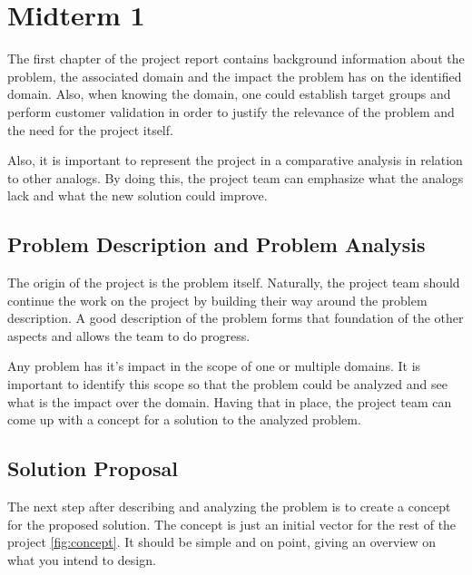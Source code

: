 \chapter{Midterm 1}

The first chapter of the project report contains background information about the problem, the associated domain and the impact the problem has on the identified domain. 
Also, when knowing the domain, one could establish target groups and perform customer validation in order to justify the relevance of the problem and the need for the project itself. \cite{chicago}

Also, it is important to represent the project in a comparative analysis in relation to other analogs. 
By doing this, the project team can emphasize what the analogs lack and what the new solution could improve.


\section{Problem Description and Problem Analysis}

The origin of the project is the problem itself. 
Naturally, the project team should continue the work on the project by building their way around the problem description. 
A good description of the problem forms that foundation of the other aspects and allows the team to do progress.

Any problem has it's impact in the scope of one or multiple domains.
It is important to identify this scope so that the problem could be analyzed and see what is the impact over the domain. 
Having that in place, the project team can come up with a concept for a solution to the analyzed problem. \cite{chicago}


\section{Solution Proposal}

The next step after describing and analyzing the problem is to create a concept for the proposed solution. 
The concept is just an initial vector for the rest of the project \ref{fig:concept}. 
It should be simple and on point, giving an overview on what you intend to design.
\vspace{0.5cm}

